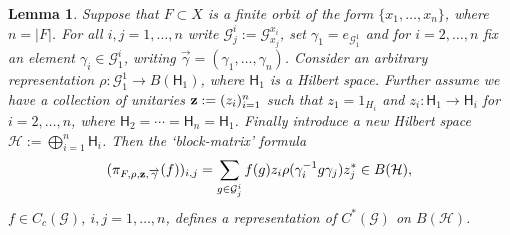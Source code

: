 \documentclass[11 pt, leqno, hidelinks]{amsart}%
\theoremstyle{plain}
\newtheorem{lemma}[theorem]{Lemma}
\numberwithin{equation}{section}
\newcommand{\GG}{\mathcal{G}}
\newcommand{\Hil}{\mathsf{H}}
\begin{document}
\begin{lemma}\label{lem:concreteform}
Suppose that $F\subset X$ is a finite orbit of the form $\{x_1, \ldots, x_n\}$, where $n = |F|$. For all $i,j=1, \ldots, n$ write $\GG_{j}^i:= \GG_{x_j}^{x_{i}}$, set $\gamma_{1}=e_{\GG_1^1}$   and for $i=2,\ldots, n$ fix  an element $\gamma_i \in \GG_{1}^{i}$, writing $\overrightarrow{\gamma}=(\gamma_1, \ldots, \gamma_n)$. Consider an arbitrary representation $\rho: \GG_{1}^1 \to B(\Hil_1)$, where $\Hil_1$ is a Hilbert space. Further assume we have a collection of unitaries ${\bf{z}}:=(z_i)_{i=1}^{n}$ such that $z_1=1_{H_i}$ and $z_i:\Hil_1\to \Hil_{i}$ for $i=2,\ldots, n$, where $\Hil_2=\cdots=\Hil_n = \Hil_1$. Finally
introduce a new Hilbert space $\mathcal{H}:=\bigoplus_{i=1}^n \Hil_i$. Then the `block-matrix' formula
\[ (\pi_{F, \rho, \bf{z}, \overrightarrow{\gamma}} (f))_{i,j} = \sum_{g \in \GG_j^i} f(g) z_{i} \rho (\gamma_{i}^{-1}g \gamma_{j}) z_j^*\in B(\mathcal{H}),  \]
$f \in C_c(\GG)$, $i,j=1, \ldots, n$,
defines a representation of $C^*(\GG)$ on $B(\mathcal{H})$.
	\end{lemma}
\end{document}
